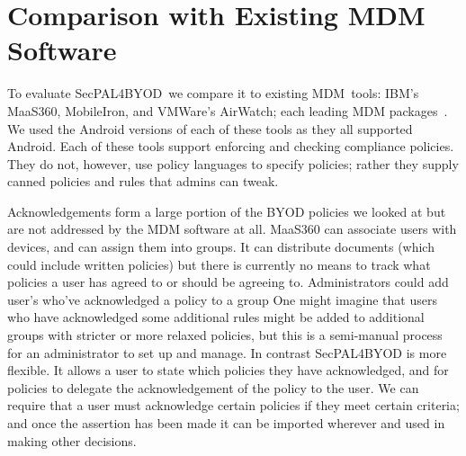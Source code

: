 \documentclass{llncs}
\newcommand{\AppPAL}[0]{SecPAL4BYOD}
\begin{document}
\section{Comparison with Existing MDM Software}

To evaluate \AppPAL~we compare it to existing MDM~tools: IBM's MaaS360, MobileIron, and VMWare's AirWatch; each leading MDM packages~\cite{rob_smith_magic_2016}.
We used the Android versions of each of these tools as they all supported Android.
Each of these tools support enforcing and checking compliance policies. 
They do not, however, use policy languages to specify policies; rather they supply canned policies and rules that admins can tweak.

Acknowledgements form a large portion of the BYOD policies we looked at but are not addressed by the MDM software at all.
MaaS360 can associate users with devices, and can assign them into groups.
It can distribute documents (which could include written policies) but there is currently no means to track what policies a user has agreed to or should be agreeing to.
Administrators could add user's who've acknowledged a policy to a group
One might imagine that users who have acknowledged some additional rules might be added to additional groups with stricter or more relaxed policies, but this is a semi-manual process for an administrator to set up and manage.
In contrast \AppPAL{} is more flexible. 
It allows a user to state which policies they have acknowledged, and for policies to delegate the acknowledgement of the policy to the user.
We can require that a user must acknowledge certain policies if they meet certain criteria;
and once the assertion has been made it can be imported wherever and used in making other decisions.
\end{document}
